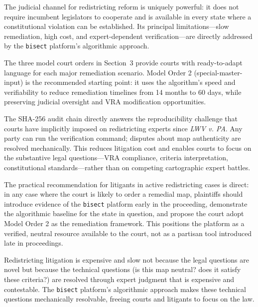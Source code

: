 The judicial channel for redistricting reform is uniquely powerful: it does not require incumbent legislators to cooperate and is available in every state where a constitutional violation can be established. Its principal limitations---slow remediation, high cost, and expert-dependent verification---are directly addressed by the \texttt{bisect} platform's algorithmic approach.

The three model court orders in Section~3 provide courts with ready-to-adapt language for each major remediation scenario. Model Order 2 (special-master-input) is the recommended starting point: it uses the algorithm's speed and verifiability to reduce remediation timelines from 14 months to 60 days, while preserving judicial oversight and VRA modification opportunities.

The SHA-256 audit chain directly answers the reproducibility challenge that courts have implicitly imposed on redistricting experts since \textit{LWV v. PA}. Any party can run the verification command; disputes about map authenticity are resolved mechanically. This reduces litigation cost and enables courts to focus on the substantive legal questions---VRA compliance, criteria interpretation, constitutional standards---rather than on competing cartographic expert battles.

The practical recommendation for litigants in active redistricting cases is direct: in any case where the court is likely to order a remedial map, plaintiffs should introduce evidence of the \texttt{bisect} platform early in the proceeding, demonstrate the algorithmic baseline for the state in question, and propose the court adopt Model Order 2 as the remediation framework. This positions the platform as a verified, neutral resource available to the court, not as a partisan tool introduced late in proceedings.

Redistricting litigation is expensive and slow not because the legal questions are novel but because the technical questions (is this map neutral? does it satisfy these criteria?) are resolved through expert judgment that is expensive and contestable. The \texttt{bisect} platform's algorithmic approach makes these technical questions mechanically resolvable, freeing courts and litigants to focus on the law.
